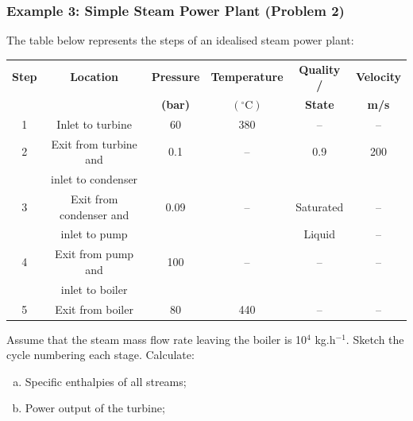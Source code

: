 \documentclass[10pt,compress,handout,ignorenonframetext]{beamer}
\begin{document}
\begin{frame}
 \frametitle{Example 3: Simple Steam Power Plant (Problem 2)}
 \scriptsize
   The table below represents the steps of an idealised steam power plant:
    \begin{center}
     \begin{tabular}{||c | c | c | c | c | c ||}
      \hline\hline
       {\bf Step} & {\bf Location}       & {\bf Pressure}  & {\bf Temperature}     & {\bf Quality /}  &{\bf Velocity}    \\
                  &                      & {\bf (bar)}     &{\bf$\left(^{\circ}\text{C}\right)$}& {\bf State} & {\bf m/s} \\
      \hline\hline
          1       & Inlet to turbine     &   60            &   380                 &  --              &       --         \\
      \hline
          2       & Exit from turbine and&   0.1           &    --                 & 0.9              &  200             \\
                  & inlet to condenser   &                 &                       &                  &                  \\ 
      \hline
          3       & Exit from condenser and&  0.09         &  --                   & Saturated        &  --              \\
                  & inlet to pump        &                 &                       & Liquid           &   --             \\
      \hline
          4       & Exit from pump and   &  100            &   --                  &     --           &   --             \\
                  & inlet to boiler      &                 &                       &                  &                  \\
      \hline 
          5       & Exit from boiler     &  80             &  440                  &      --          &    --            \\
           \hline\hline
     \end{tabular}
    \end{center}
    Assume that the steam mass flow rate leaving the boiler is 10$^{4}$ kg.h$^{-1}$. Sketch the cycle numbering each stage. Calculate:
      \begin{enumerate}[(a)]
         \item Specific enthalpies of all streams;
         \item Power output of the turbine;

\end{enumerate}
\end{frame}
\end{document}
